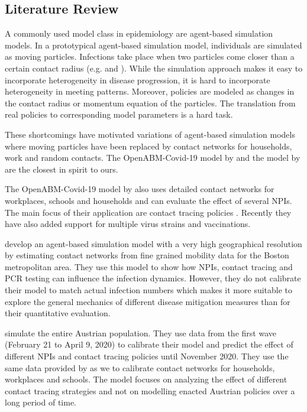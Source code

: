 \subsection{Literature Review}
\label{sec:literature_review}

A commonly used model class in epidemiology are agent-based simulation models.
In a prototypical agent-based simulation model, individuals are simulated as
moving particles. Infections take place when two particles come closer than a
certain contact radius (e.g. \citet{Silva2020} and \citet{Cuevas2020}). While
the simulation approach makes it easy to incorporate heterogeneity in disease
progression, it is hard to incorporate heterogeneity in meeting patterns.
Moreover, policies are modeled as changes in the contact radius or momentum
equation of the particles. The translation from real policies to corresponding
model parameters is a hard task.

These shortcomings have motivated variations of agent-based simulation models
where moving particles have been replaced by contact networks for households,
work and random contacts. The OpenABM-Covid-19 model by \citet{Hinch2021a} and
the model by \citet{Aleta2020} are the closest in spirit to ours.

The OpenABM-Covid-19 model by \citet{Hinch2021a} also uses detailed contact
networks for workplaces, schools and households and can evaluate the effect of
several NPIs. The main focus of their application are contact tracing policies
\citep{Abueg2021}. Recently they have also added support for multiple virus
strains and vaccinations.

\citet{Aleta2020} develop an agent-based simulation model with a very high
geographical resolution by estimating contact networks from fine grained
mobility data for the Boston metropolitan area. They use this model to show how
NPIs, contact tracing and PCR testing can influence the infection dynamics.
However, they do not calibrate their model to match actual infection numbers
which makes it more suitable to explore the general mechanics of different
disease mitigation measures than for their quantitative evaluation.

\citet{Bicher2021} simulate the entire Austrian population. They use data from the first
wave (February 21 to April 9, 2020) to calibrate their model and predict the effect of
different NPIs and contact tracing policies until November 2020. They use the same data
provided by \citet{Mossong2008} as we to calibrate contact networks for households,
workplaces and schools. The model focuses on analyzing the effect of different contact
tracing strategies and not on modelling enacted Austrian policies over a long period
of time.

